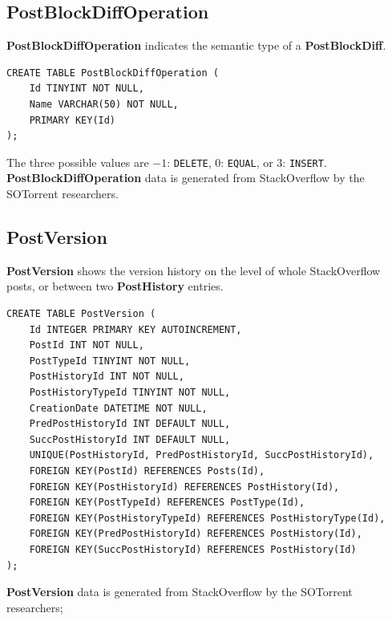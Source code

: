 \documentclass[a4paper,11pt, notitlepage]{report}
\theoremstyle{definition}
\numberwithin{equation}{section}		%
\begin{document}
\subsection{PostBlockDiffOperation}
\textbf{PostBlockDiffOperation} indicates the semantic type of a \textbf{PostBlockDiff}.
\begin{lstlisting}
CREATE TABLE PostBlockDiffOperation (
    Id TINYINT NOT NULL,
    Name VARCHAR(50) NOT NULL,
    PRIMARY KEY(Id)
);
\end{lstlisting}
The three possible values are $-1$: \texttt{DELETE}, $0$: \texttt{EQUAL}, or $3$: \texttt{INSERT}. \textbf{PostBlockDiffOperation} data is generated from StackOverflow by the SOTorrent researchers.

\subsection{PostVersion}
\textbf{PostVersion} shows the version history on the level of whole StackOverflow posts, or between two \textbf{PostHistory} entries.
\begin{lstlisting}
CREATE TABLE PostVersion (
    Id INTEGER PRIMARY KEY AUTOINCREMENT,
    PostId INT NOT NULL,
    PostTypeId TINYINT NOT NULL,
    PostHistoryId INT NOT NULL,
    PostHistoryTypeId TINYINT NOT NULL,
    CreationDate DATETIME NOT NULL,
    PredPostHistoryId INT DEFAULT NULL,
    SuccPostHistoryId INT DEFAULT NULL,
    UNIQUE(PostHistoryId, PredPostHistoryId, SuccPostHistoryId),
    FOREIGN KEY(PostId) REFERENCES Posts(Id),
    FOREIGN KEY(PostHistoryId) REFERENCES PostHistory(Id),
    FOREIGN KEY(PostTypeId) REFERENCES PostType(Id),
    FOREIGN KEY(PostHistoryTypeId) REFERENCES PostHistoryType(Id),
    FOREIGN KEY(PredPostHistoryId) REFERENCES PostHistory(Id),
    FOREIGN KEY(SuccPostHistoryId) REFERENCES PostHistory(Id)
);
\end{lstlisting}
\textbf{PostVersion} data is generated from StackOverflow by the SOTorrent researchers;
\end{document}
